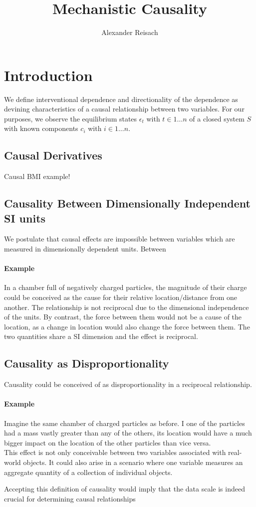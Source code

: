 \documentclass{article}
\title{Mechanistic Causality}
\author{Alexander Reisach}
\begin{document}
\maketitle
    
\section{Introduction}
We define interventional dependence and directionality of the dependence as devining characteristics of a causal relationship between two variables.
For our purposes, we observe the equilibrium states $\epsilon_t$ with $t \in 1 \dots n$ of a closed system $S$ with known components $c_i$ with $i \in 1 \dots n$. 

\subsection{Causal Derivatives}
Causal BMI example!

\subsection{Causality Between Dimensionally Independent SI units}
We postulate that causal effects are impossible between variables which are measured in dimensionally dependent units. Between 

\paragraph{Example} In a chamber full of negatively charged particles, the magnitude of their charge could be conceived as the cause for their relative location/distance from one another. The relationship is not reciprocal due to the dimensional independence of the units. By contrast, the force between them would not be a cause of the location, as a change in location would also change the force between them. The two quantities share a SI dimension and the effect is reciprocal.

\subsection{Causality as Disproportionality}
Causality could be conceived of as disproportionality in a reciprocal relationship. 

\paragraph{Example} Imagine the same chamber of charged particles as before. I one of the particles had a mass vastly greater than any of the others, its location would have a much bigger impact on the location of the other particles than vice versa.\\

This effect is not only conceivable between two variables associated with real-world objects. It could also arise in a scenario where one variable measures an aggregate quantity of a collection of individual objects.

Accepting this definition of causality would imply that the data scale is indeed crucial for determining causal relationships
\end{document}
